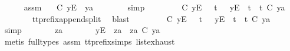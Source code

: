 \begin{isabellebody}
\ \ \ \ \isamarkupfalse%
\ assm{}\ \isamarkupfalse%
\ {\isachardoublequoteopen}{\isasymsigma}{\isacharprime}\ {\isasymle}\isactrlsub C\ {\isacharbrackleft}{\isacharbrackleft}y{\isacharbrackright}\isactrlsub E{\isacharbrackright}\ {\isacharat}\ ya{\isachardoublequoteclose}\isanewline
\ \ \ \ \ \ \isamarkupfalse%
\ simp\isanewline
\ \ \ \ \isamarkupfalse%
\ \isamarkupfalse%
\ {\isachardoublequoteopen}{\isasymsigma}{\isacharprime}\ {\isasymle}\isactrlsub C\ {\isacharbrackleft}{\isacharbrackleft}y{\isacharbrackright}\isactrlsub E{\isacharbrackright}\ \ {\isasymor}\ {\isacharparenleft}{\isasymexists}t{\isacharprime}{\isachardot}\ {\isasymsigma}{\isacharprime}\ {\isacharequal}\ {\isacharbrackleft}{\isacharbrackleft}y{\isacharbrackright}\isactrlsub E{\isacharbrackright}\ {\isacharat}\ t{\isacharprime}\ {\isasymand}\ t{\isacharprime}\ {\isasymle}\isactrlsub C\ ya{\isacharparenright}{\isachardoublequoteclose}\isanewline
\ \ \ \ \ \ \isamarkupfalse%
\ tt{\isacharunderscore}prefix{\isacharunderscore}append{\isacharunderscore}split\ \isamarkupfalse%
\ blast\isanewline
\ \ \ \ \isamarkupfalse%
\ \isamarkupfalse%
\ {\isachardoublequoteopen}{\isasymsigma}{\isacharprime}\ {\isasymle}\isactrlsub C\ {\isacharbrackleft}{\isacharbrackleft}y{\isacharbrackright}\isactrlsub E{\isacharbrackright}\ \ {\isasymor}\ {\isacharparenleft}{\isasymexists}t{\isacharprime}{\isachardot}\ {\isasymsigma}{\isacharprime}\ {\isacharequal}\ {\isacharbrackleft}y{\isacharbrackright}\isactrlsub E\ {\isacharhash}\ t{\isacharprime}\ {\isasymand}\ t{\isacharprime}\ {\isasymle}\isactrlsub C\ ya{\isacharparenright}{\isachardoublequoteclose}\isanewline
\ \ \ \ \ \ \isamarkupfalse%
\ simp\isanewline
\ \ \ \ \isamarkupfalse%
\ \isamarkupfalse%
\ za\ \ {\isachardoublequoteopen}{\isasymsigma}{\isacharprime}\ {\isacharequal}\ {\isacharbrackleft}{\isacharbrackright}\ {\isasymor}\ {\isacharparenleft}{\isasymsigma}{\isacharprime}\ {\isacharequal}\ {\isacharbrackleft}y{\isacharbrackright}\isactrlsub E\ {\isacharhash}\ za\ {\isasymand}\ za\ {\isasymle}\isactrlsub C\ ya{\isacharparenright}{\isachardoublequoteclose}\isanewline
\ \ \ \ \ \ \isamarkupfalse%
\ {\isacharparenleft}metis\ {\isacharparenleft}full{\isacharunderscore}types{\isacharparenright}\ assm{}\ tt{\isacharunderscore}prefix{\isachardot}simps{\isacharparenleft}{}{\isacharparenright}\ list{\isachardot}exhaust{\isacharparenright}\isanewline

\end{isabellebody}
